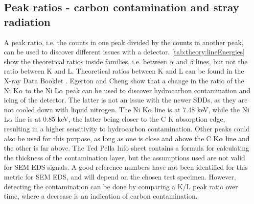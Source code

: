 \subsection{Peak ratios - carbon contamination and stray radiation}
\label{theory:eds_performance:peakratio}

A peak ratio, i.e. the counts in one peak divided by the counts in another peak, can be used to discover different issues with a detector.
\cref{tab:theory:lineEnergies} show the theoretical ratios inside families, i.e. between $\alpha$ and $\beta$ lines, but not the ratio between K and L.
Theoretical ratios between K and L can be found in the X-ray Data Booklet \cite{thompson_x-ray_2004}.
Egerton and Cheng \cite{egerton_nio_characterization_1994} show that a change in the ratio of the Ni K$\alpha$ to the Ni L$\alpha$ peak can be used to discover hydrocarbon contamination and icing of the detector.
The latter is not an issue with the newer SDDs, as they are not cooled down with liquid nitrogen.
The Ni K$\alpha$ line is at 7.48 keV, while the Ni L$\alpha$ line is at 0.85 keV, the latter being closer to the C K absorption edge, resulting in a higher sensitivity to hydrocarbon contamination.
Other peaks could also be used for this purpose, as long as one is close and above the C K$\alpha$ line and the other is far above.
The Ted Pella Info sheet \cite{ted_pella_nio_tem_2019} contains a formula for calculating the thickness of the contamination layer, but the assumptions used are not valid for SEM EDS signals.
A good reference numbers have not been identified for this metric for SEM EDS, and will depend on the chosen test specimen.
However, detecting the contamination can be done by comparing a K/L peak ratio over time, where a decrease is an indication of carbon contamination.


